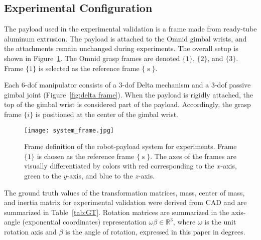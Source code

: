 \documentclass[letterpaper, 10 pt, journal, twoside]{IEEEtran}
\newcommand{\real}{\mathbb{R}}
\newcommand{\frames}{\operatorname{s}}
\begin{document}
\subsection{Experimental Configuration}
The payload used in the experimental validation is a frame made from ready-tube aluminum extrusion. The payload is attached to the Omnid gimbal wrists, and the attachments remain unchanged during experiments. The overall setup is shown in Figure~\ref{fig:frame}. The Omnid grasp frames are denoted $\{1\}$, $\{2\}$, and $\{3\}$. 
Frame $\{1\}$ is selected as the reference frame $\{\frames\}$.

Each 6-dof manipulator consists of a 3-dof Delta mechanism and a 3-dof passive gimbal joint (Figure~\ref{fig:delta frame}). When the payload is rigidly attached, the top of the gimbal wrist is considered part of the payload. Accordingly, the grasp frame $\{i\}$ is positioned at the center of the gimbal wrist. 


\begin{figure}
    \vspace{2pt}
    \centering
    \texttt{[image: system\_frame.jpg]}
    \caption{Frame definition of the robot-payload system for experiments. Frame $\{1\}$ is chosen as the reference frame $\{\frames\}$. The axes of the frames are visually differentiated by colors with red corresponding to the $x$-axis, green to the $y$-axis, and blue to the $z$-axis.}
    \label{fig:frame}
\end{figure}

The ground truth values of the transformation matrices, mass, center of mass, and inertia matrix for experimental validation were derived from CAD and are summarized in Table~\ref{tab:GT}. Rotation matrices are summarized in the axis-angle (exponential coordinates) representation $\omega \beta \in \real^3$, where $\omega$ is the unit rotation axis and $\beta$ is the angle of rotation, expressed in this paper in degrees.
\end{document}
